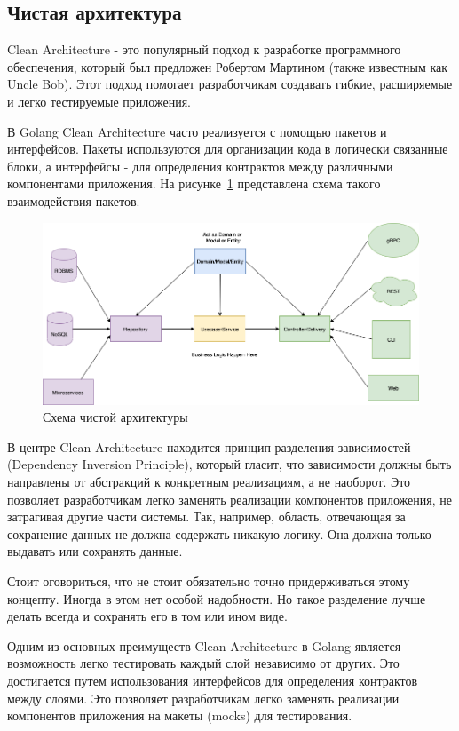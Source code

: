 \subsection{Чистая архитектура} \label{clean-arch}
Clean Architecture - это популярный подход к разработке программного обеспечения, 
который был предложен Робертом Мартином (также известным как Uncle Bob). 
Этот подход помогает разработчикам создавать гибкие, расширяемые и легко тестируемые приложения.

В Golang Clean Architecture часто реализуется с помощью пакетов и интерфейсов. 
Пакеты используются для организации кода в логически связанные блоки, 
а интерфейсы - для определения контрактов между различными компонентами приложения.
На рисунке~\ref{clean-arch-pic} представлена схема такого взаимодействия пакетов.

\begin{figure}
    \includegraphics[scale=0.5]{imgs/clean-arch}
    \caption{Схема чистой архитектуры}
    \label{clean-arch-pic}
\end{figure}

В центре Clean Architecture находится принцип разделения зависимостей (Dependency Inversion Principle), который гласит, что зависимости должны быть направлены от абстракций к конкретным реализациям, а не наоборот.
Это позволяет разработчикам легко заменять реализации компонентов приложения, не затрагивая другие части системы.
Так, например, область, отвечающая за сохранение данных не должна содержать никакую логику.
Она должна только выдавать или сохранять данные.

Стоит оговориться, что не стоит обязательно точно придерживаться этому концепту.
Иногда в этом нет особой надобности.
Но такое разделение лучше делать всегда и сохранять его в том или ином виде.

Одним из основных преимуществ Clean Architecture в Golang является возможность легко тестировать каждый слой независимо от других. 
Это достигается путем использования интерфейсов для определения контрактов между слоями. 
Это позволяет разработчикам легко заменять реализации компонентов приложения на макеты (mocks) для тестирования.

